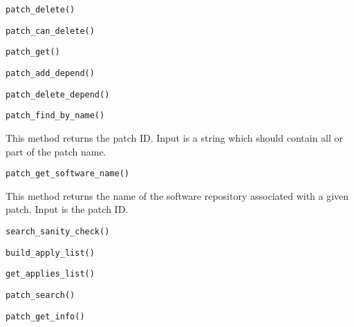 \begin{verbatim}
patch_delete()
\end{verbatim}
\begin{verbatim}
patch_can_delete()
\end{verbatim}
\begin{verbatim}
patch_get()
\end{verbatim}
\begin{verbatim}
patch_add_depend()
\end{verbatim}
\begin{verbatim}
patch_delete_depend()
\end{verbatim}
\begin{verbatim}
patch_find_by_name()
\end{verbatim}
This method returns the patch ID.  Input is a string which should contain all or part of the patch name.
\begin{verbatim}
patch_get_software_name()
\end{verbatim}
This method returns the name of the software repository associated with a given patch.  Input is the patch ID.
\begin{verbatim}
search_sanity_check()
\end{verbatim}
\begin{verbatim}
build_apply_list()
\end{verbatim}
\begin{verbatim}
get_applies_list()
\end{verbatim}
\begin{verbatim}
patch_search()
\end{verbatim}
\begin{verbatim}
patch_get_info()
\end{verbatim}

